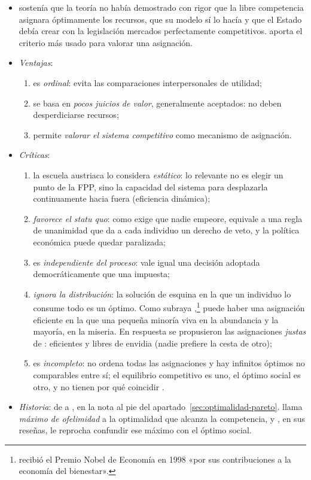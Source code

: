 \documentclass[11pt]{article}
\begin{document}
\begin{itemize}
\item {} sostenía que la teoría no había demostrado con rigor que la libre competencia asignara óptimamente los recursos, que su modelo sí lo hacía y que el Estado debía crear con la legislación mercados perfectamente competitivos. \textcite{Pareto1906Manuale} aporta el criterio más usado para valorar una asignación.
\item \emph{Ventajas}:
  \begin{enumerate}
  \item es \emph{ordinal}: evita las comparaciones interpersonales de utilidad;
  \item se basa en \emph{pocos juicios de valor}, generalmente aceptados: no deben desperdiciarse recursos;
  \item permite \emph{valorar el sistema competitivo} como mecanismo de asignación.
  \end{enumerate}
\item \emph{Críticas}:
  \begin{enumerate}
  \item la escuela austriaca lo considera \emph{estático}: lo relevante no es elegir un punto de la FPP, sino la capacidad del sistema para desplazarla continuamente hacia fuera (eficiencia dinámica);
  \item \emph{favorece el statu quo}: como exige que nadie empeore, equivale a una regla de unanimidad que da a cada individuo un derecho de veto, y la política económica puede quedar paralizada;
  \item es \emph{independiente del proceso}: vale igual una decisión adoptada democráticamente que una impuesta;
  \item \emph{ignora la distribución}: la solución de esquina en la que un individuo lo consume todo es un óptimo. Como subraya ,\footnote{ recibió el Premio Nobel de Economía en 1998 «por sus contribuciones a la economía del bienestar»\nocite{Nobel1998Sen}.} puede haber una asignación eficiente en la que una pequeña minoría viva en la abundancia y la mayoría, en la miseria. En respuesta se propusieron las asignaciones \emph{justas} de : eficientes y libres de envidia (nadie prefiere la cesta de otro);
  \item es \emph{incompleto}: no ordena todas las asignaciones y hay infinitos óptimos no comparables entre sí; el equilibrio competitivo es uno, el óptimo social es otro, y no tienen por qué coincidir .
  \end{enumerate}
\item \emph{Historia}: de  a , en la nota al pie del apartado~\ref{sec:optimalidad-pareto}.  llama \emph{máximo de ofelimidad} a la optimalidad que alcanza la competencia, y , en sus reseñas\nocite{Wicksell1958Selected}, le reprocha confundir ese máximo con el óptimo social.
\end{itemize}
\end{document}
